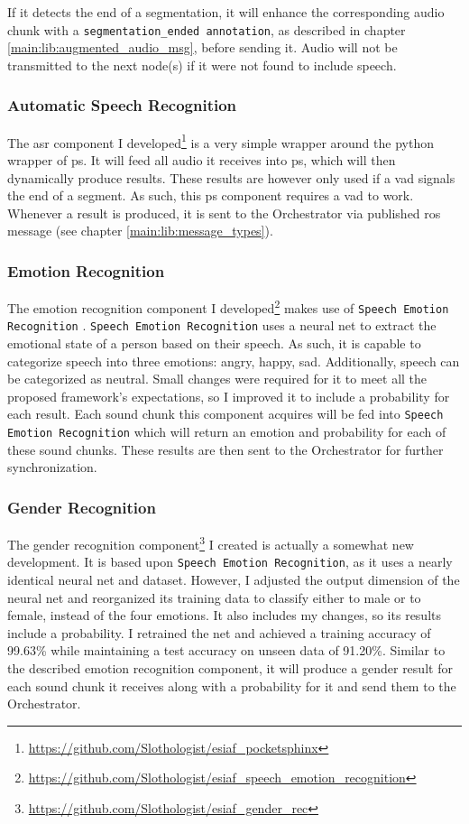 If it detects the end of a segmentation, it will enhance the corresponding audio chunk with a \texttt{segmentation\_ended annotation}, as described in chapter \ref{main:lib:augmented_audio_msg}, before sending it.
Audio will not be transmitted to the next node(s) if it were not found to include speech.

\subsubsection{Automatic Speech Recognition}
\label{main:components:ps}
The \gls{asr} component I developed\footnote{\url{https://github.com/Slothologist/esiaf_pocketsphinx}} is a very simple wrapper around the python wrapper of \gls{ps}.
It will feed all audio it receives into \gls{ps}, which will then dynamically produce results.
These results are however only used if a \gls{vad} signals the end of a segment.
As such, this \gls{ps} component requires a \gls{vad} to work.
Whenever a result is produced, it is sent to the Orchestrator via published \gls{ros} message (see chapter \ref{main:lib:message_types}).

\subsubsection{Emotion Recognition}
\label{main:components:emotion}
The emotion recognition component I developed\footnote{\url{https://github.com/Slothologist/esiaf_speech_emotion_recognition}} makes use of \texttt{Speech Emotion Recognition} \cite{speech-em-rec}.
\texttt{Speech Emotion Recognition} uses a neural net to extract the emotional state of a person based on their speech.
As such, it is capable to categorize speech into three emotions: angry, happy, sad.
Additionally, speech can be categorized as neutral.
Small changes were required for it to meet all the proposed framework's expectations, so I improved it to include a probability for each result. %
Each sound chunk this component acquires will be fed into \texttt{Speech Emotion Recognition} which will return an emotion and probability for each of these sound chunks.
These results are then sent to the Orchestrator for further synchronization.

\subsubsection{Gender Recognition}
\label{main:components:gender}
The gender recognition component\footnote{\url{https://github.com/Slothologist/esiaf_gender_rec}} I created is actually a somewhat new development.
It is based upon \texttt{Speech Emotion Recognition}, as it uses a nearly identical neural net and dataset.
However, I adjusted the output dimension of the neural net and reorganized its training data to classify either to male or to female, instead of the four emotions.
It also includes my changes, so its results include a probability.
I retrained the net and achieved a training accuracy of 99.63\% while maintaining a test accuracy on unseen data of 91.20\%.
Similar to the described emotion recognition component, it will produce a gender result for each sound chunk it receives along with a probability for it and send them to the Orchestrator.

